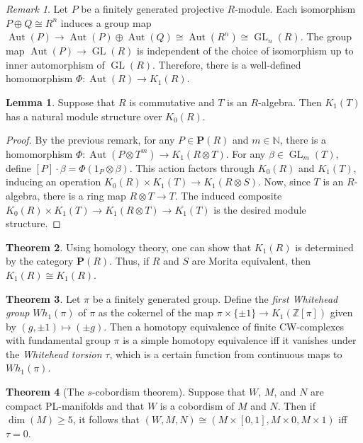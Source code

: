\documentclass[10pt,letterpaper,cm]{nupset}
\theoremstyle{definition}
\theoremstyle{theorem}
\newtheorem{theorem}{Theorem}
\newtheorem{lemma}[theorem]{Lemma}
\theoremstyle{remark}
\newtheorem{remark}{Remark}
\newcommand{\N}{\mathbb N}
\renewcommand{\P}{\mathbf P}
\newcommand{\Z}{\mathbb Z}
\newcommand{\1}{\mathbf{1}}
\newcommand{\0}{\vec 0}
\DeclareMathOperator*{\GL}{GL}
\DeclareMathOperator{\aut}{Aut}
\begin{document}
\begin{remark}
Let $P$ be a finitely generated projective $R$-module. Each isomorphism $P \oplus Q \cong R^n$ induces a group map $\aut(P) \to \aut(P) \oplus \aut(Q) \cong \aut(R^n) \cong \GL_n(R)$. The group map $\aut(P) \to \GL(R)$ is independent of the choice of isomorphism up to inner automorphism of $\GL(R)$. Therefore, there is a well-defined homomorphism $\Phi: \aut(R) \to K_1(R)$.
\end{remark}

\begin{lemma}
Suppose that $R$ is commutative and $T$ is an $R$-algebra. Then $K_1(T)$ has a natural module structure over $K_0(R)$.
\end{lemma}
\begin{proof}
By the previous remark, for any $P \in \P(R)$ and $m\in \N$, there is a homomorphism $\Phi : \aut(P \otimes T^m) \to K_1(R\otimes T).$ For any $\beta \in \GL_m(T)$, define $[P] \cdot \beta = \Phi(1_P \otimes \beta)$. This action factors through $K_0(R)$ and $K_1(T)$, inducing an operation $K_0(R) \times K_1(T) \to K_1(R \otimes S)$. Now, since $T$ is an $R$-algebra, there is a ring map $R\otimes T \to T$. The induced composite $K_0(R) \times K_1(T) \to K_1(R \otimes T) \to K_1(T)$ is the desired module structure.
\end{proof}

\begin{theorem}
Using homology theory, one can show that $K_1(R)$ is determined by the category $\P(R)$. Thus, if $R$ and $S$ are Morita equivalent, then $K_1(R) \cong K_1(R)$. 
\end{theorem}

\begin{theorem}
Let $\pi$ be a finitely generated group. Define the \textit{first Whitehead group} $Wh_1(\pi)$ of $\pi$ as the cokernel of the map $\pi \times \{\pm 1\}\to K_1(\Z[\pi])$ given by $(g, \pm 1)\mapsto (\pm g)$. Then a homotopy equivalence of finite CW-complexes with fundamental group $\pi$ is a simple homotopy equivalence iff it vanishes under the \textit{Whitehead torsion} $\tau$, which is a certain function from continuous maps to $Wh_1(\pi)$.
\end{theorem}

\begin{theorem}[The $s$-cobordism theorem]
Suppose that $W$, $M$, and $N$ are compact PL-manifolds and that $W$ is a cobordism of $M$ and $N$. Then if $\dim(M) \geq 5$, it follows that $(W, M, N) \cong (M \times [0, 1], M \times 0, M \times 1)$ iff $\tau= 0$.
\end{theorem}
\end{document}
